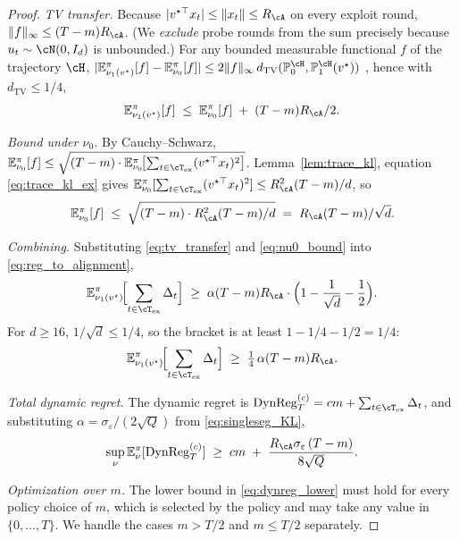 \begin{proof}
\emph{TV transfer.} Because $|v^{\star\top}x_t|\le \|x_t\|\le R_\cA$
on every exploit round, $\|f\|_\infty\le (T-m) R_\cA$. (We
\emph{exclude} probe rounds from the sum precisely because
$u_t\sim\cN(0,I_d)$ is unbounded.) For any bounded measurable
functional $f$ of the trajectory $\cH$,
$|\mathbb E^\pi_{\nu_1(v^\star)}[f] - \mathbb E^\pi_{\nu_0}[f]|
\le 2\|f\|_\infty\,d_{\mathrm{TV}}(\mathbb P_0^\cH,\mathbb P_1^\cH(v^\star))$
\citep[Lemma~2.1]{tsybakov2009introduction}, hence with
$d_{\mathrm{TV}}\le 1/4$,
\begin{equation}
\mathbb E^\pi_{\nu_1(v^\star)}[f]
\;\le\; \mathbb E^\pi_{\nu_0}[f]
\;+\; (T-m) R_\cA/2.
\label{eq:tv_transfer}
\end{equation}

\emph{Bound under $\nu_0$.} By Cauchy--Schwarz,
$\mathbb E^\pi_{\nu_0}[f]
\le \sqrt{(T-m)\cdot\mathbb E^\pi_{\nu_0}\!\bigl[\sum_{t\in\cT_{\mathrm{ex}}}(v^{\star\top}x_t)^2\bigr]}$.
Lemma~\ref{lem:trace_kl}, equation \eqref{eq:trace_kl_ex} gives
$\mathbb E^\pi_{\nu_0}[\sum_{t\in\cT_{\mathrm{ex}}}(v^{\star\top}x_t)^2]
\le R_\cA^2(T-m)/d$, so
\begin{equation}
\mathbb E^\pi_{\nu_0}[f]
\;\le\; \sqrt{(T-m)\cdot R_\cA^2(T-m)/d}
\;=\; R_\cA(T-m)/\sqrt d.
\label{eq:nu0_bound}
\end{equation}

\emph{Combining.} Substituting \eqref{eq:tv_transfer} and
\eqref{eq:nu0_bound} into \eqref{eq:reg_to_alignment},
\[
\mathbb E^\pi_{\nu_1(v^\star)}\!\Bigl[\sum_{t\in\cT_{\mathrm{ex}}}\Delta_t\Bigr]
\;\ge\; \alpha (T-m) R_\cA \cdot \Bigl(1 - \frac{1}{\sqrt d} - \frac{1}{2}\Bigr).
\]
For $d\ge 16$, $1/\sqrt d\le 1/4$, so the bracket is at least
$1 - 1/4 - 1/2 = 1/4$:
\begin{equation}
\mathbb E^\pi_{\nu_1(v^\star)}\!\Bigl[\sum_{t\in\cT_{\mathrm{ex}}}\Delta_t\Bigr]
\;\ge\; \tfrac{1}{4}\,\alpha (T-m) R_\cA.
\label{eq:reg_clean}
\end{equation}

\emph{Total dynamic regret.} The dynamic regret is
$\mathrm{DynReg}^{(c)}_T = cm + \sum_{t\in\cT_{\mathrm{ex}}}\Delta_t$,
and substituting $\alpha = \sigma_\varepsilon/(2\sqrt{Q})$ from
\eqref{eq:singleseg_KL},
\begin{equation}
\sup_\nu\mathbb E^\pi_\nu[\mathrm{DynReg}^{(c)}_T]
\;\ge\; cm \;+\; \frac{R_\cA\sigma_\varepsilon\,(T-m)}{8\sqrt{Q}}.
\label{eq:dynreg_lower}
\end{equation}

\emph{Optimization over $m$.} The lower bound in
\eqref{eq:dynreg_lower} must hold for every policy choice of $m$,
which is selected by the policy and may take any value in $\{0,\ldots,T\}$.
We handle the cases $m>T/2$ and $m\le T/2$ separately.


\end{proof}
